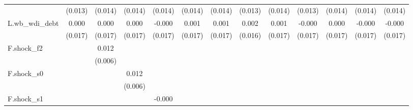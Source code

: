 {\begin{tabular}{l*{12}{c}}
            &     (0.013)         &     (0.014)         &     (0.014)         &     (0.014)         &     (0.014)         &     (0.014)         &     (0.013)         &     (0.014)         &     (0.013)         &     (0.014)         &     (0.014)         &     (0.014)         \\
\addlinespace
L.wb\_wdi\_debt&       0.000         &       0.000         &       0.000         &      -0.000         &       0.001         &       0.001         &       0.002         &       0.001         &      -0.000         &       0.000         &      -0.000         &      -0.000         \\
            &     (0.017)         &     (0.017)         &     (0.017)         &     (0.017)         &     (0.017)         &     (0.017)         &     (0.016)         &     (0.017)         &     (0.017)         &     (0.017)         &     (0.017)         &     (0.017)         \\
\addlinespace
F.shock\_f2  &                     &       0.012\sym{*}  &                     &                     &                     &                     &                     &                     &                     &                     &                     &                     \\
            &                     &     (0.006)         &                     &                     &                     &                     &                     &                     &                     &                     &                     &                     \\
\addlinespace
F.shock\_s0  &                     &                     &       0.012\sym{*}  &                     &                     &                     &                     &                     &                     &                     &                     &                     \\
            &                     &                     &     (0.006)         &                     &                     &                     &                     &                     &                     &                     &                     &                     \\
\addlinespace
F.shock\_s1  &                     &                     &                     &      -0.000         &                     &                     &                     &                     &                     &                     &                     &                     \\

\end{tabular}}
